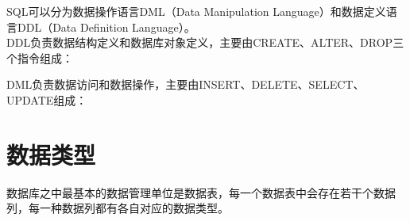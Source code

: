 \documentclass[12pt, openany, oneside]{book}
\begin{document}
SQL可以分为数据操作语言DML（Data Manipulation Language）和数据定义语言DDL（Data Definition Language）。\\

DDL负责数据结构定义和数据库对象定义，主要由CREATE、ALTER、DROP三个指令组成：

\begin{table}[H]
	\centering
	\caption{DDL指令}
\end{table}

DML负责数据访问和数据操作，主要由INSERT、DELETE、SELECT、UPDATE组成：

\begin{table}[H]
	\centering
	\caption{DML指令}
\end{table}

\vspace{0.5cm}

\section{数据类型}

数据库之中最基本的数据管理单位是数据表，每一个数据表中会存在若干个数据列，每一种数据列都有各自对应的数据类型。\\
\end{document}
